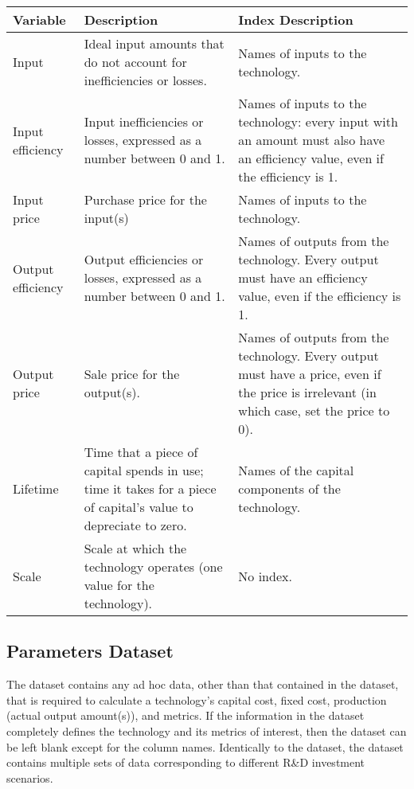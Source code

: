 \documentclass[letterpaper,10pt,english]{sphinxmanual}
\begin{document}
\begin{savenotes}\sphinxattablestart
\centering
{}
\sphinxthecaptionisattop
{}\label{\detokenize{cheat-sheet:table-2}}\label{\detokenize{cheat-sheet:tbl-designsvars}}
\sphinxaftertopcaption
\begin{tabulary}{\linewidth}[t]{|T|T|T|}
\hline
\sphinxstyletheadfamily 
Variable
&\sphinxstyletheadfamily 
Description
&\sphinxstyletheadfamily 
Index Description
\\
\hline
Input
&
Ideal input amounts that do not account for inefficiencies or losses.
&
Names of inputs to the technology.
\\
\hline
Input efficiency
&
Input inefficiencies or losses, expressed as a number between 0 and 1.
&
Names of inputs to the technology: every input with an amount must also have an efficiency value, even if the efficiency is 1.
\\
\hline
Input price
&
Purchase price for the input(s)
&
Names of inputs to the technology.
\\
\hline
Output efficiency
&
Output efficiencies or losses, expressed as a number between 0 and 1.
&
Names of outputs from the technology. Every output must have an efficiency value, even if the efficiency is 1.
\\
\hline
Output price
&
Sale price for the output(s).
&
Names of outputs from the technology. Every output must have a price, even if the price is irrelevant (in which case, set the price to 0).
\\
\hline
Lifetime
&
Time that a piece of capital spends in use; time it takes for a piece of capital’s value to depreciate to zero.
&
Names of the capital components of the technology.
\\
\hline
Scale
&
Scale at which the technology operates (one value for the technology).
&
No index.
\\
\hline
\end{tabulary}
\par
\sphinxattableend\end{savenotes}


\subsection{Parameters Dataset}
\label{\detokenize{cheat-sheet:parameters-dataset}}
The  dataset contains any ad hoc data, other than that contained in the  dataset, that is required to calculate a technology’s capital cost, fixed cost, production (actual output amount(s)), and metrics. If the information in the  dataset completely defines the technology and its metrics of interest, then the  dataset can be left blank except for the column names. Identically to the  dataset, the  dataset contains multiple sets of data corresponding to different R\&D investment scenarios.
\end{document}
